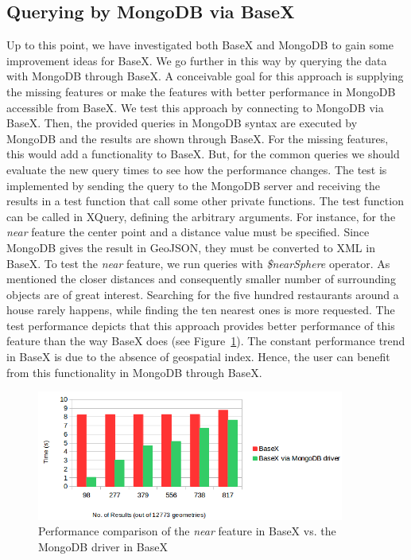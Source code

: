 \documentclass[a4paper,12pt]{article}
\begin{document}
\subsection{Querying by MongoDB via BaseX}
\label{MongoviaBX}
Up to this point, we have investigated both BaseX and MongoDB to gain some improvement ideas for BaseX. We go further in this way by querying the data with MongoDB through BaseX. A conceivable goal for this approach is supplying the missing features or make the features with better performance in MongoDB accessible from BaseX. We test this approach by connecting to MongoDB via BaseX. Then, the provided queries in MongoDB syntax are executed by MongoDB and the results are shown through BaseX. For the missing features, this would add a functionality to BaseX. But, for the common queries we should evaluate the new query times to see how the performance changes.
The test is implemented by sending the query to the MongoDB server and receiving the results in a test function that call some other private functions. The test function can be called in XQuery, defining the arbitrary arguments. For instance, for the \textit{near} feature the center point and a distance value must be specified. Since MongoDB gives the result in GeoJSON, they must be converted to XML in BaseX. %
To test the \textit{near} feature, we run queries with \textit{\$nearSphere} operator. As mentioned the closer distances and consequently smaller number of surrounding objects are of great interest. Searching for the five hundred restaurants around a house rarely happens, while finding the ten nearest ones is more requested. The test performance depicts that this approach provides better performance of this feature than the way BaseX does (see Figure~\ref{figMongoviaBX-near}). The constant performance trend in BaseX is due to the absence of geospatial index. Hence, the user can benefit from this functionality in MongoDB through BaseX. 
 
\begin{figure}
\centering
\includegraphics[width=0.9\textwidth]{MongoviaBX-near-wih-jsonToXML.png}
\caption{Performance comparison of the \textit{near} feature in BaseX vs. the MongoDB driver in BaseX}
\label{figMongoviaBX-near}
\end{figure}
\end{document}

